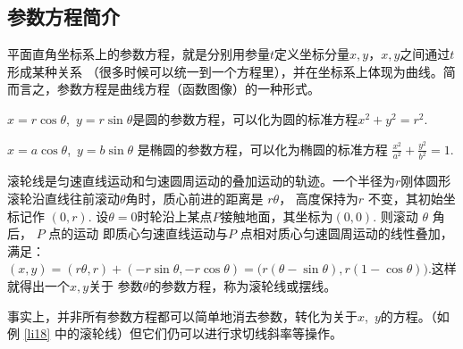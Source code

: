 \subsection{参数方程简介}
平面直角坐标系上的参数方程，就是分别用参量$t$定义坐标分量$x,y$，$x,y$之间通过$t$形成某种关系
（很多时候可以统一到一个方程里），并在坐标系上体现为曲线。简而言之，参数方程是曲线方程（函数图像）的一种形式。
\begin{example}
    $ x=r\cos \theta$,~$y=r\sin \theta$是圆的参数方程，可以化为圆的标准方程$x^2+y^2=r^2.$
\end{example}
\begin{example}
    $ x=a\cos \theta$,~$y=b\sin \theta$ 是椭圆的参数方程，可以化为椭圆的标准方程
    $\displaystyle \frac{x^2}{a^2}+\frac{y^2}{b^2}=1.$
\end{example}
\begin{example}\label{li18}
    滚轮线是匀速直线运动和匀速圆周运动的叠加运动的轨迹。一个半径为$r$刚体圆形滚轮沿直线往前滚动$\theta$角时，质心前进的距离是 $r\theta $，
    高度保持为$r$ 不变，其初始坐标记作 $(0,r)$. 设$\theta =0$时轮沿上某点$P$接触地面，其坐标为$(0,0)$. 则滚动 $\theta$ 角后，
    $P$ 点的运动 即质心匀速直线运动与$P$ 点相对质心匀速圆周运动的线性叠加，满足：
    $(x,y) = (r\theta ,r) + (-r\sin \theta,-r\cos \theta) = \bigl(r(θ - \sin θ),r(1 - \cos θ)\bigr)$.这样就得出一个$x,y$关于
    参数$\theta $的参数方程，称为滚轮线或摆线。

    \begin{center}
    \end{center}
\end{example}
事实上，并非所有参数方程都可以简单地消去参数，转化为关于$x$,~$y$的方程。（如例 \autoref{li18} 中的滚轮线）但它们仍可以进行求切线斜率等操作。


